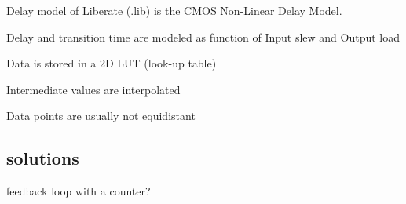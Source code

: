 Delay model of Liberate (.lib) is the CMOS Non-Linear Delay Model.
\begin{s_itemize}
\item Delay and transition time are modeled as function of Input slew and Output load
\item Data is stored in a 2D LUT (look-up table)
\item Intermediate values are interpolated
\item Data points are usually not equidistant
\end{s_itemize}





\subsection*{solutions}
feedback loop with a counter?